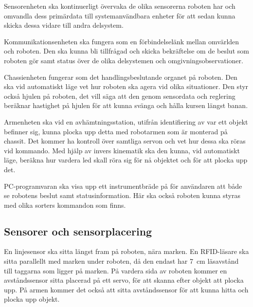 \documentclass[a4paper,12pt]{article}
\begin{document}
Sensorenheten ska kontinuerligt övervaka de olika sensorerna roboten har och omvandla dess primärdata till systemanvändbara enheter för att sedan kunna skicka dessa vidare till andra delsystem.

Kommunikationsenheten ska fungera som en förbindelselänk mellan omvärlden och roboten. Den ska kunna bli tillfrågad och skicka bekräftelse om de beslut som roboten gör samt status över de olika delsystemen och omgivningsobservationer.

Chassienheten fungerar som det handlingsbeslutande organet på roboten. Den ska vid automatiskt läge vet hur roboten ska agera vid olika situationer. Den styr också hjulen på roboten, det vill säga att den genom sensordata och reglering beräknar hastighet på hjulen för att kunna svänga och hålla kursen längst banan.

Armenheten ska vid en avhämtningsstation, utifrån identifiering av var ett objekt befinner sig, kunna plocka upp detta med robotarmen som är monterad på chassit. Det kommer ha kontroll över samtliga servon och vet hur dessa ska röras vid kommando. Med hjälp av invers kinematik ska den kunna, vid automatiskt läge, beräkna hur vardera led skall röra sig för nå objektet och för att plocka upp det.

PC-programvaran ska visa upp ett instrumentbräde på för användaren att både se robotens beslut samt statusinformation. Här ska också roboten kunna styras med olika sorters kommandon som finns.

\subsection{Sensorer och sensorplacering}

En linjesensor ska sitta längst fram på roboten, nära marken. En RFID-läsare ska sitta parallellt med marken under roboten, då den endast har 7~cm läsavstånd till taggarna som ligger på marken. På vardera sida av roboten kommer en avståndssensor sitta placerad på ett servo, för att skanna efter objekt att plocka upp. På armen kommer det också att sitta avståndssensor för att kunna hitta och plocka upp objekt.








\newpage
\appendix


\end{document}
